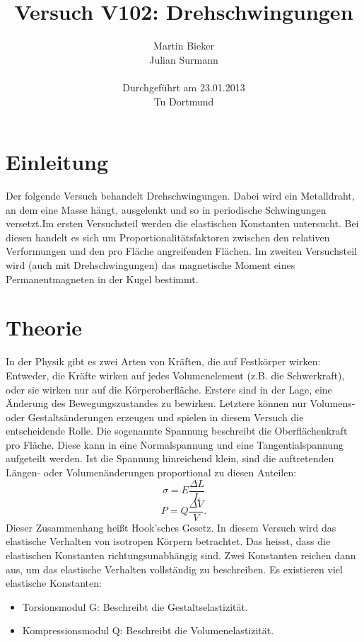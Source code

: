 \documentclass[11pt,ngerman,a4paper]{article}
\title{\textbf{Versuch V102: Drehschwingungen}}
\author{Martin Bieker\\
		Julian Surmann\\
		\\
		Durchgef\"{u}hrt am 23.01.2013\\
		Tu Dortmund}
\date{}
\begin{document}
\renewcommand\tablename{Tabelle}
\renewcommand\figurename{Abbildung}
\maketitle
\thispagestyle{empty}
\newpage
\clearpage
\setcounter{page}{1}

\section{Einleitung}
Der folgende Versuch behandelt Drehschwingungen. Dabei wird ein Metalldraht, an dem eine Masse hängt, ausgelenkt und so in periodische Schwingungen versetzt.Im ersten Versuchsteil werden die elastischen Konstanten untersucht. Bei diesen handelt es sich um Proportionalitätsfaktoren zwischen den relativen Verformungen und den pro Fläche angreifenden Flächen.
Im zweiten Versuchsteil wird (auch mit Drehschwingungen) das magnetische Moment eines Permanentmagneten in der Kugel bestimmt.
\section{Theorie}
In der Physik gibt es zwei Arten von Kräften, die auf Festkörper wirken: Entweder, die Kräfte wirken auf jedes Volumenelement (z.B. die Schwerkraft), oder sie wirken nur auf die Körperoberfläche. Erstere sind in der Lage, eine Änderung des Bewegungszustandes zu bewirken. Letztere können nur Volumens- oder Gestaltsänderungen erzeugen und spielen in diesem Versuch die entscheidende Rolle. Die sogenannte Spannung beschreibt die Oberflächenkraft pro Fläche. Diese kann in eine Normalspannung und eine Tangentialspannung aufgeteilt werden. Ist die Spannung hinreichend klein, sind die auftretenden Längen- oder Volumenänderungen proportional zu diesen Anteilen:
\begin{equation}
\label{1}
\sigma = E\frac{\Delta L}{L}
\end{equation}
\begin{equation}
\label{2}
P = Q\frac{\Delta V}{V}.
\end{equation}
Dieser Zusammenhang heißt Hook'sches Gesetz.\newline
In diesem Versuch wird das elastische Verhalten von isotropen Körpern betrachtet. Das heisst, dass die elastischen Konstanten richtungsunabhängig sind. Zwei Konstanten reichen dann aus, um das elastische Verhalten vollständig zu beschreiben. Es existieren viel elastische Konstanten:
\begin{itemize}
\item Torsionsmodul G: Beschreibt die Gestaltselastizität.
\item Kompressionsmodul Q: Beschreibt die Volumenelastizität.
\end{itemize}
\end{document}
